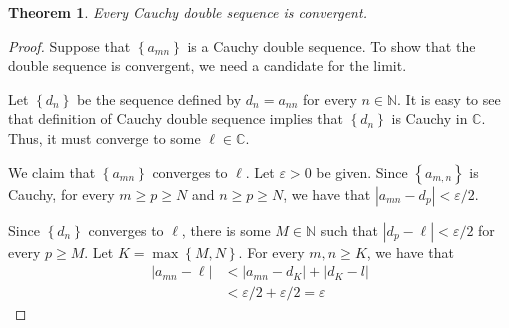 \documentclass[12pt]{article}
\newtheorem{theorem}{Theorem}[subsection]
\theoremstyle{definition}
\theoremstyle{remark}
\theoremstyle{plain}
\newcommand{\N}{\mathbb N}
\newcommand{\C}{\mathbb C}
\begin{document}
\begin{theorem}
    Every Cauchy double sequence is convergent.
\end{theorem}

\begin{proof}
    Suppose that $\left\{ a_{mn} \right\}$ is a Cauchy double sequence. To show that the double sequence is convergent, we need a candidate for the limit. 
    
    Let $\left\{ d_n \right\}$ be the sequence defined by $d_n = a_{nn}$ for every $n\in\N$. It is easy to see that definition of Cauchy double sequence implies that $\left\{ d_n \right\}$ is Cauchy in $\C$. Thus, it must converge to some $\ell \in \C$.

    We claim that $\left\{ a_{mn} \right\}$ converges to $\ell $. Let $\varepsilon > 0$ be given. Since $\left\{ a_{m,n} \right\}$ is Cauchy, for every $m\ge p \ge N$ and $n \ge p \ge N$, we have that $|a_{mn}-d_p|< \varepsilon /2$.

    Since $\left\{ d_n \right\}$ converges to $\ell$, there is some $M \in \N$ such that $|d_{p} - \ell | < \varepsilon /2$ for every $p\ge M$.
    Let $K=\max \left\{ M,N \right\}$. For every $m,n \ge K$, we have that 
    \begin{align*}
	|a_{mn}-\ell| &< |a_{mn} - d_K| + |d_K - l| \\
    &< \varepsilon /2 + \varepsilon /2 = \varepsilon  	
    \end{align*}
\end{proof}
\end{document}
